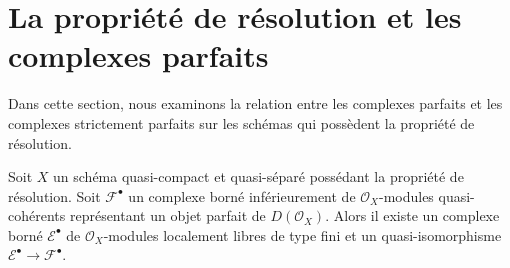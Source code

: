 \section{La propriété de résolution et les complexes parfaits}
\label{section-resolution-property-perfect}

\noindent
Dans cette section, nous examinons la relation entre les complexes parfaits
et les complexes strictement parfaits sur les schémas qui possèdent la propriété de résolution.

\begin{lemma}
\label{lemma-construct-strictly-perfect}
Soit $X$ un schéma quasi-compact et quasi-séparé possédant la
propriété de résolution.
Soit $\mathcal{F}^\bullet$ un complexe borné inférieurement de
$\mathcal{O}_X$-modules quasi-cohérents représentant un objet parfait de
$D(\mathcal{O}_X)$. Alors il existe un complexe borné
$\mathcal{E}^\bullet$ de $\mathcal{O}_X$-modules localement libres de type fini
et un quasi-isomorphisme $\mathcal{E}^\bullet \to \mathcal{F}^\bullet$.
\end{lemma}


